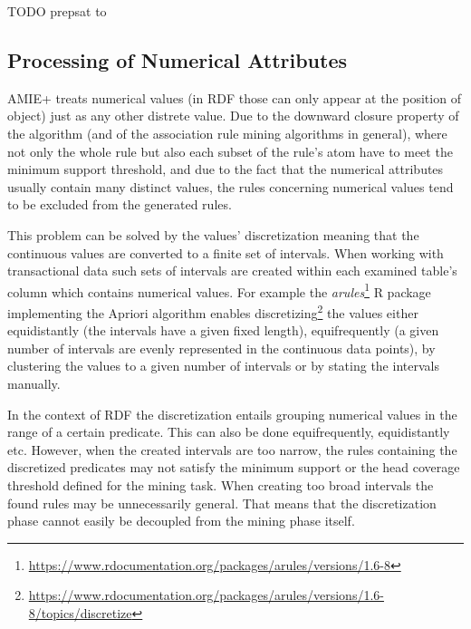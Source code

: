 TODO prepsat to




\subsection{Processing of Numerical Attributes}

AMIE+ treats numerical values (in RDF those can only appear at the position of object) just as any other distrete value. Due to the downward closure property of the algorithm (and of the association rule mining algorithms in general), where not only the whole rule but also each subset of the rule's atom have to meet the minimum support threshold, and due to the fact that the numerical attributes usually contain many distinct values, the rules concerning numerical values tend to be excluded from the generated rules.

This problem can be solved by the values' discretization meaning that the continuous values are converted to a finite set of intervals. When working with transactional data such sets of intervals are created within each examined table's column which contains numerical values. For example the \textit{arules}\footnote{\href{https://www.rdocumentation.org/packages/arules/versions/1.6-8}{https://www.rdocumentation.org/packages/arules/versions/1.6-8}} R package implementing the Apriori algorithm enables discretizing\footnote{\href{https://www.rdocumentation.org/packages/arules/versions/1.6-8/topics/discretize}{https://www.rdocumentation.org/packages/arules/versions/1.6-8/topics/discretize}} the values either equidistantly (the intervals have a given fixed length), equifrequently (a given number of intervals are evenly represented in the continuous data points), by clustering the values to a given number of intervals or by stating the intervals manually.

In the context of RDF the discretization entails grouping numerical values in the range of a certain predicate. This can also be done equifrequently, equidistantly etc. However, when the created intervals are too narrow, the rules containing the discretized predicates may not satisfy the minimum support or the head coverage threshold defined for the mining task. When creating too broad intervals the found rules may be unnecessarily general. That means that the discretization phase cannot easily be decoupled from the mining phase itself.

